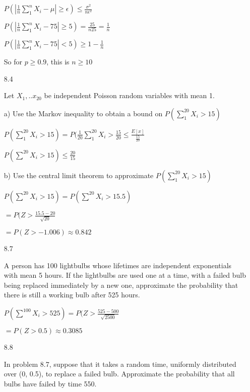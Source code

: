 \documentclass[11pt]{article}
\begin{document}
\begin{itemize}
		$P(|\frac{1}{n} \sum_{1}^{n} X_i
		- \mu| \geq \epsilon) \leq \frac{\sigma^2}{n\epsilon^2}$

		$P(|\frac{1}{n}\sum_{1}^{n} X_i - 75| \geq 5) =
		\frac{25}{n25} = \frac{1}{n}$

		$P(|\frac{1}{n}\sum_{1}^{n} X_i - 75| < 5) \geq
		1 - \frac{1}{n}$

		So for $p \geq 0.9$, this is $n \geq 10$

	\item[8.4]
		
		Let $X_1, ..x_{20}$ be independent Poisson random 
		variables with mean 1.

		a) Use the Markov inequality to obtain a bound on
		$P(\sum_{1}^{20} X_i > 15)$

		$P(\sum_1^{20} X_i > 15) = P(\frac{1}{20}\sum_{1}^{20}X_i
		> \frac{15}{20} \leq \frac{E[x]}{\frac{15}{20}}$

		$P(\sum^{20} X_i > 15) \leq \frac{20}{15}$

		b) Use the central limit theorem to approximate
		$P(\sum_1^{20} X_i > 15)$

		$P(\sum^{20} X_i > 15) = P(\sum^{20} X_i > 15.5)$

		$=P(Z > \frac{15.5-20}{\sqrt{20}}$

		$=P(Z > -1.006) \approx 0.842$

	\item[8.7]

		A person has 100 lightbulbs whose lifetimes are 
		independent exponentials with mean 5 hours.
		If the lightbulbs are used one at a time, with
		a failed bulb being replaced immediately by a new one,
		approximate the probability that there is still a
		working bulb after 525 hours.

		$P(\sum^{100} X_i > 525) = P(Z > \frac{525-500}{
			\sqrt{2500}}$

		$= P(Z > 0.5) \approx 0.3085$

	\item[8.8]

		In problem 8.7, suppose that it takes a random time,
		uniformly distributed over (0, 0.5), to replace a 
		failed bulb. Approximate the probability that all bulbs
		have failed by time 550.

\end{itemize}
\end{document}
